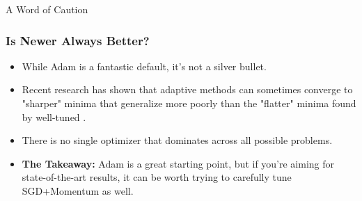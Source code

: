 \begin{frame}{A Word of Caution}
    \frametitle{Is Newer Always Better?}
    \begin{itemize}
        \item While Adam is a fantastic default, it's not a silver bullet.
        \item Recent research has shown that adaptive methods can sometimes converge to "sharper" minima that generalize more poorly than the "flatter" minima found by well-tuned .
        \item There is no single optimizer that dominates across all possible problems.
        \item \textbf{The Takeaway:} Adam is a great starting point, but if you're aiming for state-of-the-art results, it can be worth trying to carefully tune SGD+Momentum as well.
    \end{itemize}
\end{frame}

